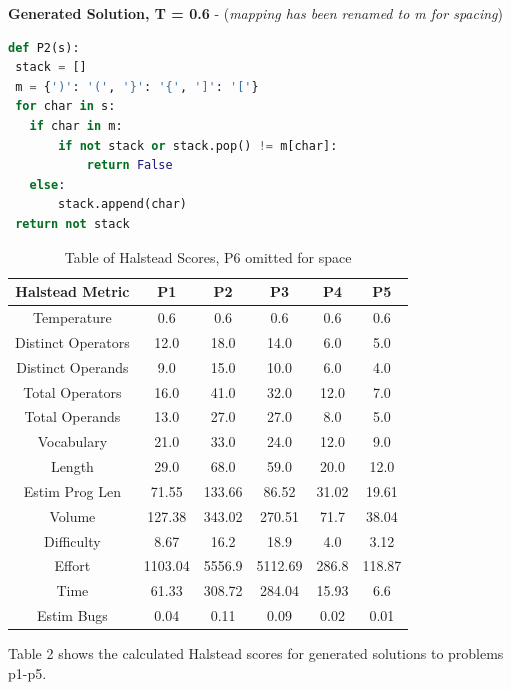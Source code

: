 \documentclass[manuscript,screen,review,sigconf]{acmart}
\begin{document}
\textbf{Generated Solution, T = 0.6} - (\textit{mapping has been renamed to m for spacing})
\begin{lstlisting}[language=Python]
def P2(s):
 stack = []
 m = {')': '(', '}': '{', ']': '['}
 for char in s:
   if char in m:
       if not stack or stack.pop() != m[char]:
           return False
   else:
       stack.append(char)
 return not stack
\end{lstlisting}


\begin{table}[H]
    \centering
    \begin{tabular}{|c|c|c|c|c|c|} \hline
         \textbf{Halstead Metric} & P1 & P2 & P3 & P4 & P5 \\
         \hline
         Temperature & 0.6 & 0.6 & 0.6 & 0.6 & 0.6 \\
         Distinct Operators & 12.0 & 18.0 & 14.0 & 6.0 & 5.0 \\
         Distinct Operands & 9.0 & 15.0 & 10.0 & 6.0 & 4.0 \\
         Total Operators & 16.0 & 41.0 & 32.0 & 12.0 & 7.0 \\
         Total Operands & 13.0 & 27.0 & 27.0 & 8.0 & 5.0 \\
         Vocabulary & 21.0 & 33.0 & 24.0 & 12.0 & 9.0 \\
         Length & 29.0 & 68.0 & 59.0 & 20.0 & 12.0 \\
         Estim Prog Len & 71.55 & 133.66 & 86.52 & 31.02 & 19.61 \\
         Volume & 127.38 & 343.02 & 270.51 & 71.7 & 38.04 \\
         Difficulty & 8.67 & 16.2 & 18.9 & 4.0 & 3.12 \\
         Effort & 1103.04 & 5556.9 & 5112.69 & 286.8 & 118.87 \\
         Time & 61.33 & 308.72 & 284.04 & 15.93 & 6.6 \\
         Estim Bugs & 0.04 & 0.11 & 0.09 & 0.02 & 0.01 \\
    \end{tabular}
    \caption{Table of Halstead Scores, P6 omitted for space}
    \label{tab:HalsteadMetrics}
\end{table}

Table 2 shows the calculated Halstead scores for generated solutions to problems p1-p5.

\end{document}
